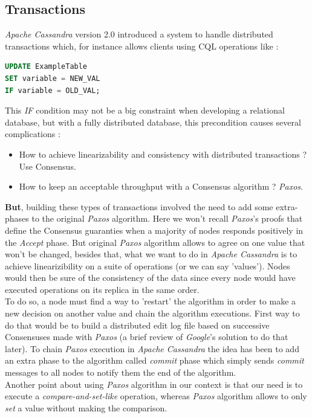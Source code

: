 \documentclass[a4paper]{report}
\newcommand{\ca}{\emph{Apache Cassandra\xspace}}
\newcommand{\px}{\emph{Paxos\xspace}}
\begin{document}
\subsection{Transactions}
\ca{} version 2.0 introduced a system to handle distributed transactions which, for instance allows clients using CQL operations like :
\vspace{0.7cm}
\begin{lstlisting}[label=cql-ex-1, caption=CQL Update Example, language=SQL]
UPDATE ExampleTable
SET variable = NEW_VAL
IF variable = OLD_VAL;
\end{lstlisting}
\vspace{0.7cm}
This \emph{IF} condition may not be a big constraint when developing a relational database, but with a fully distributed database, this precondition causes several complications : 
\begin{itemize}
	\item How to achieve linearizability and consistency with distributed transactions ? Use Consensus.
	\item How to keep an acceptable throughput with a Consensus algorithm ? \px{}\cite{Lamport1}.
\end{itemize}
{\bfseries But}, building these types of transactions involved the need to add some extra-phases to the original \px{} algorithm. Here we won't recall \px{}'s proofs that define the Consensus guaranties when a majority of nodes responds positively in the \emph{Accept} phase. But original \px{} algorithm allows to agree on one value that won't be changed, besides that, what we want to do in \ca{} is to achieve linearizibility on a suite of operations (or we can say 'values'). Nodes would then be sure of the consistency of the data since every node would have executed operations on its replica in the same order. \\
To do so, a node must find a way to 'restart' the algorithm in order to make a new decision on another value and chain the algorithm executions. First way to do that would be to build a distributed edit log file based on successive Consensuses made with \px{} (a brief review of \emph{Google}'s solution to do that later). To chain \px{} execution in \ca{} the idea has been to add an extra phase to the algorithm called \emph{commit} phase which simply sends \emph{commit} messages to all nodes to notify them the end of the algorithm.\\
Another point about using \px{} algorithm in our context is that our need is to execute a \emph{compare-and-set-like} operation, whereas \px{} algorithm allows to only \emph{set} a value without making the comparison. \\
\end{document}
